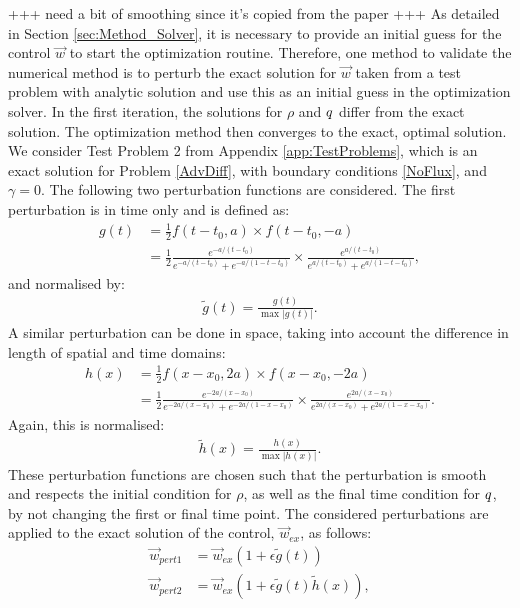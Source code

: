 +++ need a bit of smoothing since it's copied from the paper +++
As detailed in Section \ref{sec:Method_Solver}, it is necessary to provide an initial guess for the control $\vec{w}$ to start the optimization routine. Therefore, one method to validate the numerical method is to perturb the exact solution for $\vec{w}$ taken from a test problem with analytic solution and use this as an initial guess in the optimization solver. In the first iteration, the solutions for $\rho$ and $q$ differ from the exact solution. The optimization method then converges to the exact, optimal solution. We consider Test Problem 2 from Appendix \ref{app:TestProblems}, which is an exact solution for Problem \eqref{AdvDiff}, with boundary conditions \eqref{NoFlux}, and $\gamma = 0$. 
The following two perturbation functions are considered. The first perturbation is in time only and is defined as:
\begin{align*}
g(t) &= \frac{1}{2} f(t-t_0, a) \times f(t-t_0, -a)\\
&= \frac{1}{2} \frac{e^{-a/(t-t_0)}}{e^{-a/(t-t_0)} + e^{-a/(1-t -t_0)}} \times \frac{e^{a/(t-t_0)}}{e^{a/(t-t_0)} + e^{a/(1-t - t_0)}},
\end{align*}
and normalised by:
\begin{align*}
\tilde g(t) = \frac{g(t)}{\max{|{g(t)}|}}.
\end{align*}
A similar perturbation can be done in space, taking into account the difference in length of spatial and time domains:
\begin{align*}
h(x) &= \frac{1}{2} f(x-x_0, 2a) \times f(x-x_0, -2a)\\
&= \frac{1}{2} \frac{e^{-2a/(x-x_0)}}{e^{-2a/(x-x_0)} + e^{-2a/(1-x-x_0)}} \times \frac{e^{2a/(x-x_0)}}{e^{2a/(x-x_0)} + e^{2a/(1-x-x_0)}}.
\end{align*}
Again, this is normalised:
\begin{align*}
\tilde h(x) = \frac{h(x)}{\max{|{h(x)}|}}.
\end{align*}
These perturbation functions are chosen such that the perturbation is smooth and respects the initial condition for $\rho$, as well as the final time condition for $q$, by not changing the first or final time point. The considered perturbations are applied to the exact solution of the control, $\vec{w}_{ex}$, as follows:
\begin{align*}
\vec{w}_{pert1} &= \vec{w}_{ex}(1+ \epsilon \tilde g(t))\\
\vec{w}_{pert2} &= \vec{w}_{ex}(1+ \epsilon \tilde g(t) \tilde h(x)),
\end{align*}
